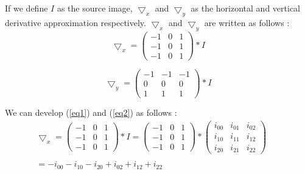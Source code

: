 \documentclass[12pt,a4paper]{article}
\begin{document}
If we define $I$ as the source image, $\bigtriangledown_x$ and $\bigtriangledown_y$ as the horizontal and vertical derivative approximation respectively. $\bigtriangledown_x$ and $\bigtriangledown_y$ are written as follows :\\

\begin{equation}\label{eq1}
\bigtriangledown_x = \begin{pmatrix}
-1 & 0 & 1 \\ 
-1 & 0 & 1 \\ 
-1 & 0 & 1
\end{pmatrix}*I
\end{equation}

\vspace{0.5cm}

\begin{equation}\label{eq2}
\bigtriangledown_y = \begin{pmatrix}
-1 & -1 & -1 \\ 
0 & 0 & 0 \\ 
1 & 1 & 1
\end{pmatrix}*I
\end{equation}

\vspace{0.5cm}

We can develop (\ref{eq1}) and (\ref{eq2}) as follows :\\

\begin{equation}\label{eq3}
\begin{matrix}
\bigtriangledown_x = \begin{pmatrix}
-1 & 0 & 1 \\ 
-1 & 0 & 1 \\ 
-1 & 0 & 1
\end{pmatrix}*I  = \begin{pmatrix}
-1 & 0 & 1 \\ 
-1 & 0 & 1 \\ 
-1 & 0 & 1
\end{pmatrix}* \begin{pmatrix}
i_{00} & i_{01} & i_{02} \\ 
i_{10} & i_{11} & i_{12}\\ 
i_{20} & i_{21} & i_{22}
\end{pmatrix}  \\ 
& & \\
 =  -i_{00}-i_{10}-i_{20}+i_{02}+i_{12}+i_{22} \\  
\end{matrix}
\end{equation}
\end{document}
